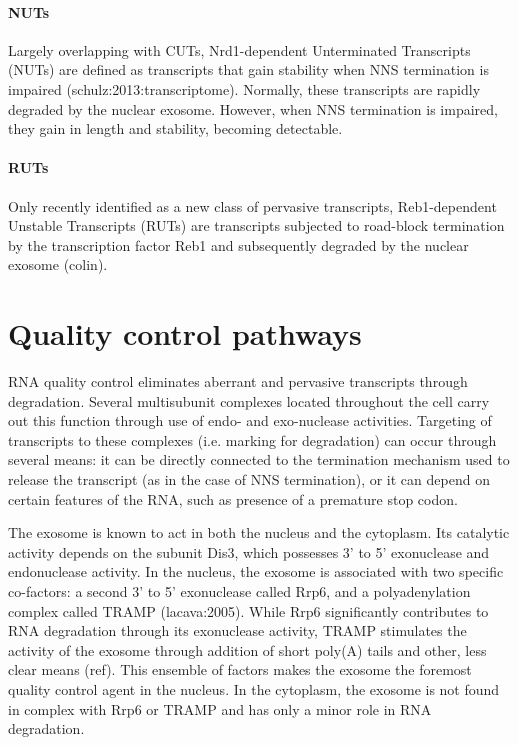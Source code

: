 \paragraph{NUTs}

Largely overlapping with CUTs, Nrd1-dependent Unterminated Transcripts (NUTs) are defined as transcripts that gain stability when NNS termination is impaired (schulz:2013:transcriptome). 
Normally, these transcripts are rapidly degraded by the nuclear exosome. 
However, when NNS termination is impaired, they gain in length and stability, becoming detectable.

\paragraph{RUTs}

Only recently identified as a new class of pervasive transcripts, Reb1-dependent Unstable Transcripts (RUTs) are transcripts subjected to road-block termination by the transcription factor Reb1 and subsequently degraded by the nuclear exosome (colin).

\section{Quality control pathways}

RNA quality control eliminates aberrant and pervasive transcripts through degradation. 
Several multisubunit complexes located throughout the cell carry out this function through use of endo- and exo-nuclease activities. 
Targeting of transcripts to these complexes (i.e. marking for degradation) can occur through several means: it can be directly connected to the termination mechanism used to release the transcript (as in the case of NNS termination), or it can depend on certain features of the RNA, such as presence of a premature stop codon.

The exosome is known to act in both the nucleus and the cytoplasm. 
Its catalytic activity depends on the subunit Dis3, which possesses 3' to 5' exonuclease and endonuclease activity. In the nucleus, the exosome is associated with two specific co-factors: a second 3' to 5' exonuclease called Rrp6, and a polyadenylation complex called TRAMP (lacava:2005). 
While Rrp6 significantly contributes to RNA degradation through its exonuclease activity, TRAMP stimulates the activity of the exosome through addition of short poly(A) tails and other, less clear means (ref). 
This ensemble of factors makes the exosome the foremost quality control agent in the nucleus. 
In the cytoplasm, the exosome is not found in complex with Rrp6 or TRAMP and has only a minor role in RNA degradation.

